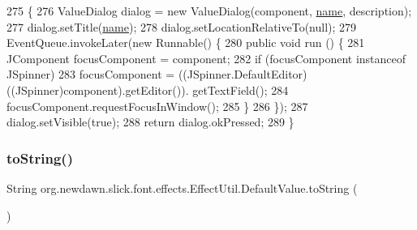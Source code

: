 \begin{DoxyCode}
275                                                                                        \{
276             ValueDialog dialog = \textcolor{keyword}{new} ValueDialog(component, \mbox{\hyperlink{classorg_1_1newdawn_1_1slick_1_1font_1_1effects_1_1_effect_util_1_1_default_value_ae33082e2b5adea01e0d97dbf24d03170}{name}}, description);
277             dialog.setTitle(\mbox{\hyperlink{classorg_1_1newdawn_1_1slick_1_1font_1_1effects_1_1_effect_util_1_1_default_value_ae33082e2b5adea01e0d97dbf24d03170}{name}});
278             dialog.setLocationRelativeTo(null);
279             EventQueue.invokeLater(\textcolor{keyword}{new} Runnable() \{
280                 \textcolor{keyword}{public} \textcolor{keywordtype}{void} run () \{
281                     JComponent focusComponent = component;
282                     \textcolor{keywordflow}{if} (focusComponent instanceof JSpinner)
283                         focusComponent = ((JSpinner.DefaultEditor)((JSpinner)component).getEditor()).
      getTextField();
284                     focusComponent.requestFocusInWindow();
285                 \}
286             \});
287             dialog.setVisible(\textcolor{keyword}{true});
288             \textcolor{keywordflow}{return} dialog.okPressed;
289         \}
\end{DoxyCode}
\mbox{\label{classorg_1_1newdawn_1_1slick_1_1font_1_1effects_1_1_effect_util_1_1_default_value_aa08f994a5d2bcc8480dff8a5b7c57033}} 
\subsubsection{\texorpdfstring{to\+String()}{toString()}}
{\footnotesize\ttfamily String org.\+newdawn.\+slick.\+font.\+effects.\+Effect\+Util.\+Default\+Value.\+to\+String (\begin{DoxyParamCaption}{ }\end{DoxyParamCaption})\hspace{0.3cm}{\ttfamily [inline]}}

